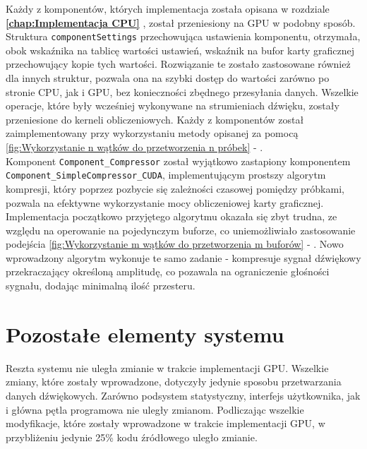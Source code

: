 Każdy z komponentów, których implementacja została opisana w rozdziale \textbf{\ref{chap:Implementacja CPU} }, został przeniesiony na GPU w podobny sposób. Struktura \texttt{componentSettings} przechowująca ustawienia komponentu, otrzymała, obok wskaźnika na tablicę wartości ustawień, wskaźnik na bufor karty graficznej przechowujący kopie tych wartości. Rozwiązanie te zostało zastosowane również dla innych struktur, pozwala ona na szybki dostęp do wartości zarówno po stronie CPU, jak i GPU, bez konieczności zbędnego przesyłania danych. Wszelkie operacje, które były wcześniej wykonywane na strumieniach dźwięku, zostały przeniesione do kerneli obliczeniowych. Każdy z komponentów został zaimplementowany przy wykorzystaniu metody opisanej za pomocą \ref{fig:Wykorzystanie n wątków do przetworzenia n próbek} - . 
\\
Komponent \texttt{Component\_Compressor} został wyjątkowo zastapiony komponentem \texttt{Component\_SimpleCompressor\_CUDA}, implementującym prostszy algorytm kompresji, który poprzez pozbycie się zależności czasowej pomiędzy próbkami, pozwala na efektywne wykorzystanie mocy obliczeniowej karty graficznej. Implementacja początkowo przyjętego algorytmu okazała się zbyt trudna, ze względu na operowanie na pojedynczym buforze, co uniemożliwiało zastosowanie podejścia
\ref{fig:Wykorzystanie m wątków do przetworzenia m buforów} - . 
Nowo wprowadzony algorytm wykonuje te samo zadanie - kompresuje sygnał dźwiękowy przekraczający określoną amplitudę, co pozawala na ograniczenie głośności sygnału, dodając minimalną ilość przesteru. 


\section{Pozostałe elementy systemu}
Reszta systemu nie uległa zmianie w trakcie implementacji GPU. Wszelkie zmiany, które zostały wprowadzone, dotyczyły jedynie sposobu przetwarzania danych dźwiękowych. Zarówno podsystem statystyczny, interfejs użytkownika, jak i główna pętla programowa nie uległy zmianom. Podliczając wszelkie modyfikacje, które zostały wprowadzone w trakcie implementacji GPU, w przybliżeniu jedynie 25\% kodu źródłowego uległo zmianie. 
